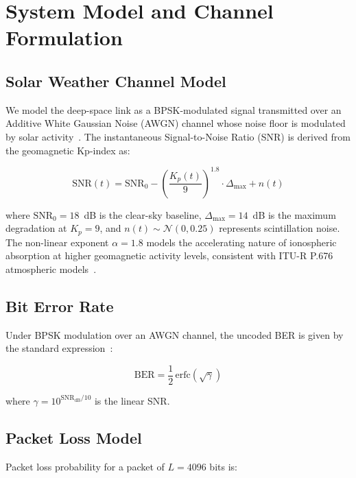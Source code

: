 \documentclass[journal]{IEEEtran}
\begin{document}

\section{System Model and Channel Formulation}

\subsection{Solar Weather Channel Model}
We model the deep-space link as a BPSK-modulated signal transmitted over an Additive White Gaussian Noise (AWGN) channel whose noise floor is modulated by solar activity~\cite{proakis2007digital}.
The instantaneous Signal-to-Noise Ratio (SNR) is derived from the geomagnetic Kp-index as:

\begin{equation}
\text{SNR}(t) = \text{SNR}_0 - \left(\frac{K_p(t)}{9}\right)^{1.8} \cdot \Delta_{\max} + n(t)
\label{eq:snr}
\end{equation}

\noindent where $\text{SNR}_0 = 18$~dB is the clear-sky baseline, $\Delta_{\max} = 14$~dB is the maximum degradation at $K_p = 9$, and $n(t) \sim \mathcal{N}(0, 0.25)$ represents scintillation noise.
The non-linear exponent $\alpha = 1.8$ models the accelerating nature of ionospheric absorption at higher geomagnetic activity levels, consistent with ITU-R P.676 atmospheric models~\cite{itu-p676}.

\subsection{Bit Error Rate}
Under BPSK modulation over an AWGN channel, the uncoded BER is given by the standard expression~\cite{proakis2007digital}:

\begin{equation}
\text{BER} = \frac{1}{2}\,\text{erfc}\!\left(\sqrt{\gamma}\right)
\label{eq:ber}
\end{equation}

\noindent where $\gamma = 10^{\text{SNR}_{\text{dB}}/10}$ is the linear SNR.

\subsection{Packet Loss Model}
Packet loss probability for a packet of $L = 4096$ bits is:
\end{document}

